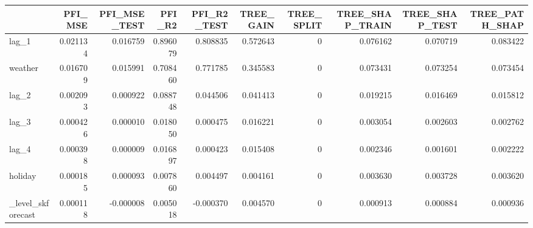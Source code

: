 \begin{tabular}{lrrrrrrrrr}
\toprule
 & PFI_MSE & PFI_MSE_TEST & PFI_R2 & PFI_R2_TEST & TREE_GAIN & TREE_SPLIT & TREE_SHAP_TRAIN & TREE_SHAP_TEST & TREE_PATH_SHAP \\
\midrule
lag_1 & 0.021134 & 0.016759 & 0.896079 & 0.808835 & 0.572643 & 0 & 0.076162 & 0.070719 & 0.083422 \\
weather & 0.016709 & 0.015991 & 0.708460 & 0.771785 & 0.345583 & 0 & 0.073431 & 0.073254 & 0.073454 \\
lag_2 & 0.002093 & 0.000922 & 0.088748 & 0.044506 & 0.041413 & 0 & 0.019215 & 0.016469 & 0.015812 \\
lag_3 & 0.000426 & 0.000010 & 0.018050 & 0.000475 & 0.016221 & 0 & 0.003054 & 0.002603 & 0.002762 \\
lag_4 & 0.000398 & 0.000009 & 0.016897 & 0.000423 & 0.015408 & 0 & 0.002346 & 0.001601 & 0.002222 \\
holiday & 0.000185 & 0.000093 & 0.007860 & 0.004497 & 0.004161 & 0 & 0.003630 & 0.003728 & 0.003620 \\
_level_skforecast & 0.000118 & -0.000008 & 0.005018 & -0.000370 & 0.004570 & 0 & 0.000913 & 0.000884 & 0.000936 \\
\bottomrule
\end{tabular}

